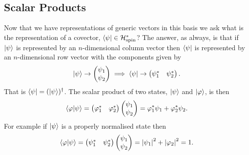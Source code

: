 \subsection{Scalar Products}
Now that we have representations of generic vectors in this basis we ask what is the representation of a covector, \(\langle {\psi} \vert\in\mathcal{H}_{\text{spin}}^*\)?
The answer, as always, is that if \(\vert {\psi} \rangle\) is represented by an \(n\)-dimensional column vector then \(\langle {\psi} \vert\) is represented by an \(n\)-dimensional row vector with the components given by
\[
\vert {\psi} \rangle \mathrel{\rightarrow} 
\begin{pmatrix}
    \psi_1\\ \psi_2
\end{pmatrix}
\implies
\langle {\psi} \vert \mathrel{\rightarrow}
\begin{pmatrix}
    \psi_1^* & \psi_2^*
\end{pmatrix}
.
\]
That is \(\langle {\psi} \vert = (\vert {\psi} \rangle)^\dagger\).
The scalar product of two states, \(\vert {\psi} \rangle\) and \(\vert {\varphi} \rangle\), is then
\[
\langle {\varphi} \vert {\psi} \rangle =
\begin{pmatrix}
    \varphi_1^* & \varphi_2^*
\end{pmatrix}
\begin{pmatrix}
    \psi_1\\ \psi_2
\end{pmatrix}
= \varphi_1^*\psi_1 + \varphi_2^*\psi_2.
\]
For example if \(\vert {\psi} \rangle\) is a properly normalised state then
\[
\langle {\varphi} \vert {\psi} \rangle =
\begin{pmatrix}
    \psi_1^* & \psi_2^*
\end{pmatrix}
\begin{pmatrix}
    \psi_1\\ \psi_2
\end{pmatrix}
= \abs{\psi_1}^2 + \abs{\varphi_2}^2  = 1.
\]

